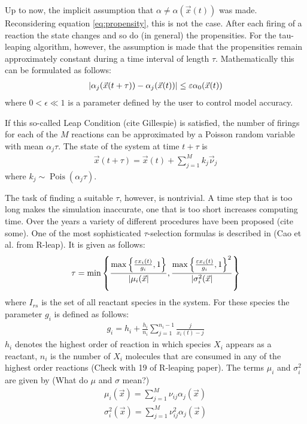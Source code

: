 Up to now, the implicit assumption that $\alpha \ne \alpha(\vec{x}(t))$ was made. Reconsidering equation \eqref{eq:propensity}, this is not the case. After each firing of a reaction the state changes and so do (in general) the propensities. For the tau-leaping algorithm, however, the assumption is made that the propensities remain approximately constant during a time interval of length $\tau$. Mathematically this can be formulated as follows:
\begin{align}
\lvert\alpha_j(\vec{x}(t+\tau)) - \alpha_j(\vec{x}(t))\rvert \leq \varepsilon \alpha_0(\vec{x}(t))
\end{align}
where $0 < \epsilon \ll 1$ is a parameter defined by the user to control model accuracy.  

If this so-called Leap Condition (cite Gillespie) is satisfied, the number of firings for each of the $M$ reactions can be approximated by a Poisson random variable with mean $\alpha_j \tau$. The state of the system at time $t + \tau$ is
\begin{align}
\vec{x}(t+\tau) = \vec{x}(t) + \sum_{j=1}^M k_j \vec{\nu}_j
\end{align}
where $k_j \sim \operatorname{Pois}(\alpha_j \tau)$.

The task of finding a suitable $\tau$, however, is nontrivial. A time step that is too long makes the simulation inaccurate, one that is too short increases computing time. Over the years a variety of different procedures have been proposed (cite some). One of the most sophisticated $\tau$-selection formulas is described in (Cao et al. from R-leap). It is given as follows:
\begin{align}
\label{eq:tau}
\tau = \min\left\{ \frac{\max \left\{ \frac{\varepsilon x_i(t)}{g_i}, 1\right\}}{\lvert\mu_i(\vec{x}\rvert}, 
\frac{\max \left\{ \frac{\varepsilon x_i(t)}{g_i}, 1 \right\}^2}{\lvert\sigma_i^2(\vec{x}\rvert} \right\}
\end{align}
where $I_{rs}$ is the set of all reactant species in the system. For these species the parameter $g_i$ is defined as follows:
\begin{align}
g_i = h_i + \frac{h_i}{n_i} \sum_{j=1}^{n_i-1} \frac{j}{x_i(t) - j}
\end{align}
$h_i$ denotes the highest order of reaction in which species $X_i$ appears as a reactant, $n_i$ is the number of $X_i$ molecules that are consumed in any of the highest order reactions (Check with 19 of R-leaping paper). The terms $\mu_i$ and $\sigma_i^2$ are given by 
\ifdebug
(What do $\mu$ and $\sigma$ mean?)
\fi
\begin{gather}
\mu_i(\vec{x}) = \sum_{j=1}^M \nu_{ij} \alpha_j(\vec{x}) \\
\sigma_i^2(\vec{x}) = \sum_{j=1}^M \nu_{ij}^2 \alpha_j(\vec{x})
\end{gather}

